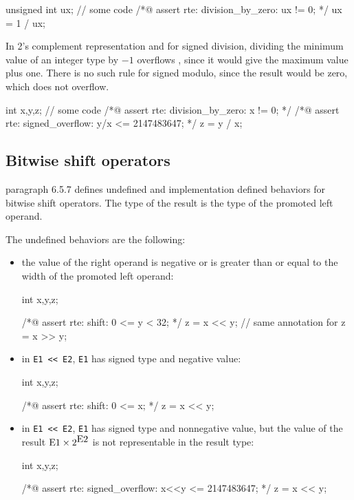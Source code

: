 \begin{listing-nonumber}
unsigned int ux;
// some code
/*@ assert rte: division_by_zero: ux != 0; */
ux = 1 / ux;
\end{listing-nonumber}

In 2's complement representation and for signed division, dividing the minimum
value of an integer type by $-1$ overflows , since it would give the maximum
value plus one.  There is no such rule for signed modulo, since the result would
be zero, which does not overflow.

\begin{listing-nonumber}
int x,y,z;
// some code
/*@ assert rte: division_by_zero: x != 0; */
/*@ assert rte: signed_overflow: y/x <= 2147483647; */
z = y / x;
\end{listing-nonumber}


\subsection{Bitwise shift operators}

\cnn{} paragraph \mbox{6.5.7} defines undefined and implementation defined
behaviors for bitwise shift operators.  The type of the result is the type of
the promoted left operand.

The undefined behaviors are the following:
\begin{itemize}
\item the value of the right operand is negative or is greater than or equal to
  the width of the promoted left operand:

\begin{listing-nonumber}
int x,y,z;

/*@ assert rte: shift: 0 <= y < 32; */
z = x << y; // same annotation for z = x >> y;
\end{listing-nonumber}

\item in \lstinline|E1 << E2|, \lstinline|E1| has signed type and negative
  value:

\begin{listing-nonumber}
int x,y,z;

/*@ assert rte: shift: 0 <= x; */
z = x << y;
\end{listing-nonumber}

\item in \lstinline|E1 << E2|, \lstinline|E1| has signed type and nonnegative
  value, but the value of the result $\lstinline|E1| \times 2^{\lstinline|E2|}$
  is not representable in the result type:

\begin{listing-nonumber}
int x,y,z;

/*@ assert rte: signed_overflow: x<<y <= 2147483647; */
z = x << y;
\end{listing-nonumber}

\end{itemize}

